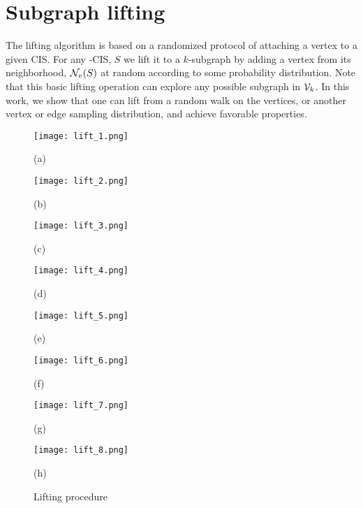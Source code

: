 
\section{Subgraph lifting}
	
	The lifting algorithm is based on a randomized protocol of attaching a vertex to a given CIS.
	For any -CIS, $S$ we lift it to a $k$-subgraph by adding a vertex from its neighborhood, $\mathcal{N}_v(S)$ at random according to some probability distribution.
	Note that this basic lifting operation can explore any possible subgraph in $\mathcal{V}_k$. 
	In this work, we show that one can lift from a random walk on the vertices, or another vertex or edge sampling distribution, and achieve favorable properties.
	

\begin{figure}[th]
\begin{center}
\hspace*{\fill}
  \texttt{[image: lift\_1.png]}
  \caption*{(a)}
\endminipage\hfill
{}
  \texttt{[image: lift\_2.png]}
  \caption*{(b)}
\endminipage\hfill
{}
  \texttt{[image: lift\_3.png]}
  \caption*{(c)}
\endminipage\hfill
{}%
  \texttt{[image: lift\_4.png]}
  \caption*{(d)}
\endminipage
\hspace*{\fill}
\vskip 5pt
\hspace*{\fill}
  \texttt{[image: lift\_5.png]}
  \caption*{(e)}
\endminipage\hfill
{}
  \texttt{[image: lift\_6.png]}
  \caption*{(f)}
\endminipage\hfill
{}
  \texttt{[image: lift\_7.png]}
  \caption*{(g)}
\endminipage\hfill
{}%
  \texttt{[image: lift\_8.png]}
  \caption*{(h)}
\endminipage\hspace*{\fill}
\caption{Lifting procedure}
\label{fig:lifting}
\end{center}
\end{figure}


